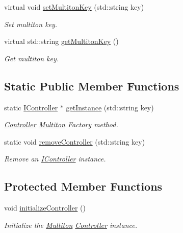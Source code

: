 \begin{DoxyCompactItemize}
virtual void \hyperlink{class_pure_m_v_c_1_1_multiton_key_heir_abc70ef7c066bc8d7bf0196ec727599bb}{setMultitonKey} (std::string key)
\begin{DoxyCompactList}\small\item\em Set multiton key. \item\end{DoxyCompactList}\item 
virtual std::string \hyperlink{class_pure_m_v_c_1_1_multiton_key_heir_aa5622459d33380deb08dc3cab8b991c7}{getMultitonKey} ()
\begin{DoxyCompactList}\small\item\em Get multiton key. \item\end{DoxyCompactList}\end{DoxyCompactItemize}
\subsection*{Static Public Member Functions}
\begin{DoxyCompactItemize}
\item 
static \hyperlink{class_pure_m_v_c_1_1_i_controller}{IController} $\ast$ \hyperlink{class_pure_m_v_c_1_1_controller_aa36b55f117c5aa573c6e1894f0d98195}{getInstance} (std::string key)
\begin{DoxyCompactList}\small\item\em {\ttfamily \hyperlink{class_pure_m_v_c_1_1_controller}{Controller}} \hyperlink{class_pure_m_v_c_1_1_multiton}{Multiton} Factory method. \item\end{DoxyCompactList}\item 
static void \hyperlink{class_pure_m_v_c_1_1_controller_a802f04dc749c8ddc8f0af2ed8db2e257}{removeController} (std::string key)
\begin{DoxyCompactList}\small\item\em Remove an \hyperlink{class_pure_m_v_c_1_1_i_controller}{IController} instance. \item\end{DoxyCompactList}\end{DoxyCompactItemize}
\subsection*{Protected Member Functions}
\begin{DoxyCompactItemize}
\item 
void \hyperlink{class_pure_m_v_c_1_1_controller_a071c576f4a0cee162f8f7355767dc247}{initializeController} ()
\begin{DoxyCompactList}\small\item\em Initialize the \hyperlink{class_pure_m_v_c_1_1_multiton}{Multiton} {\ttfamily \hyperlink{class_pure_m_v_c_1_1_controller}{Controller}} instance. \item\end{DoxyCompactList}\end{DoxyCompactItemize}
